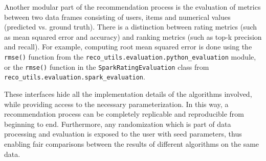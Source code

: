 Another modular part of the recommendation process is the evaluation of metrics between two data frames consisting of users, items and numerical values 
(predicted vs. ground truth). There is a distinction between rating metrics (such as mean squared error and accuracy) and ranking metrics 
(such as top-k precision and recall). For example, computing root mean squared error is done using 
the \verb!rmse()! function from the \verb!reco_utils.evaluation.python_evaluation! module, 
or the \verb!rmse()! function in the \verb!SparkRatingEvaluation! class from \verb!reco_utils.evaluation.spark_evaluation!.
 
These interfaces hide all the implementation details of the algorithms involved, while providing access to the necessary parameterization.
In this way, a recommendation process can be completely replicable and reproducible from beginning to end. Furthermore, any randomization 
which is part of data processing and evaluation is exposed to the user with seed parameters, thus enabling fair comparisons between the results of different algorithms
on the same data. 

